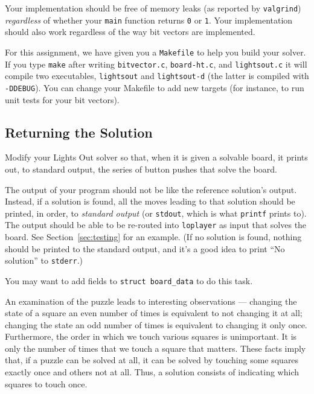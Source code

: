 \documentclass[12pt]{exam}
\begin{document}
Your implementation should be free of memory leaks (as reported by
\lstinline'valgrind') \emph{regardless} of whether your
\lstinline'main' function returns \lstinline'0' or \lstinline'1'. Your
implementation should also work regardless of the way bit vectors are
implemented.

For this assignment, we have given you a \lstinline'Makefile' to help
you build your solver. If you type \lstinline'make' after writing
\lstinline'bitvector.c', \lstinline'board-ht.c', and
\lstinline'lightsout.c' it will compile two executables,
\lstinline'lightsout' and \lstinline'lightsout-d' (the latter is
compiled with \lstinline'-DDEBUG'). You can change your Makefile to
add new targets (for instance, to run unit tests for your bit
vectors).


\subsection{Returning the Solution}

\begin{task}[5]
  Modify your Lights Out solver so that, when it is given a solvable
  board, it prints out, to standard output, the series of button
  pushes that solve the board.
\end{task}

The output of your program should not be like the reference solution's
output. Instead, if a solution is found, all the moves leading to that
solution should be printed, in order, to \emph{standard output} (or
\lstinline'stdout', which is what \lstinline'printf' prints to). The
output should be able to be re-routed into \lstinline'loplayer' as
input that solves the board. See Section~\ref{sec:testing} for an
example. (If no solution is found, nothing should be printed to the
standard output, and it's a good idea to print ``No solution'' to
\lstinline'stderr'.)


You may want to add fields to \lstinline'struct board_data' to do this
task.

An examination of the puzzle leads to interesting observations ---
changing the state of a square an even number of times is equivalent
to not changing it at all; changing the state an odd number of times
is equivalent to changing it only once. Furthermore, the order in
which we touch various squares is unimportant. It is only the number
of times that we touch a square that matters. These facts imply that,
if a puzzle can be solved at all, it can be solved by touching some
squares exactly once and others not at all. Thus, a solution consists
of indicating which squares to touch once.
\end{document}
